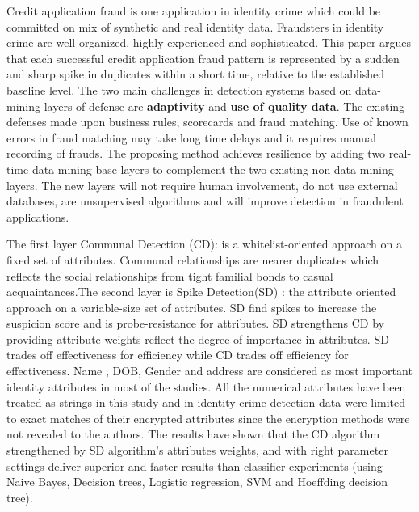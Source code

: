 \documentclass[a4paper]{article}
\begin{document}
\cite{Phua2012ResilientDetection}	Credit application fraud is one application in identity crime which could be committed on mix of synthetic and real identity data. Fraudsters in identity crime are well organized, highly experienced and sophisticated. This paper argues that each successful credit application fraud pattern is represented by a sudden and sharp spike in duplicates within a short time, relative to the established baseline level. The two main challenges in detection systems based on data-mining layers of defense are \textbf{adaptivity} and \textbf{use of quality data}. The existing defenses made upon business rules, scorecards and fraud matching. Use of known errors in fraud matching may take long time delays and it requires manual recording of frauds. The proposing method achieves resilience by adding two real-time data mining base layers to complement the two existing non data mining layers. The new layers will not require human involvement, do not use external databases, are unsupervised algorithms and will improve detection in fraudulent applications.

The first layer Communal Detection (CD): is a whitelist-oriented approach on a fixed set of attributes. Communal relationships are nearer duplicates which reflects the social relationships from tight familial bonds to casual acquaintances.The second layer is Spike Detection(SD) : the attribute oriented approach on a variable-size set of attributes. SD find spikes to increase the suspicion score and is probe-resistance for attributes. SD strengthens CD by providing attribute weights reflect the degree of importance in attributes. SD trades off effectiveness for efficiency while CD trades off efficiency for effectiveness. Name , DOB, Gender and address are considered as most important identity attributes in most of the studies. All the numerical attributes have been treated as strings in this study and in identity crime detection data were limited to exact matches of their encrypted attributes since the encryption methods  were not revealed to the authors. The results have shown that the CD algorithm strengthened by SD algorithm's attributes weights, and with right parameter settings deliver superior and faster results than classifier experiments (using Naive Bayes, Decision trees, Logistic regression, SVM and Hoeffding decision tree). 
\end{document}
